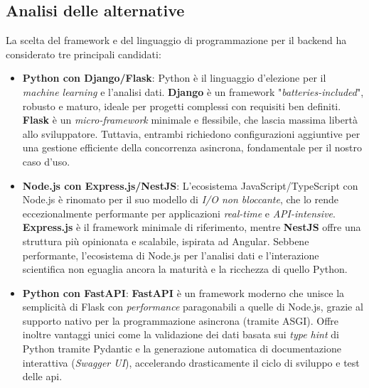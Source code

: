 \subsection{Analisi delle alternative}
La scelta del \gls{framework} e del linguaggio di programmazione per il \gls{backend} ha considerato tre principali candidati:

\begin{itemize}
    \item \textbf{Python con Django/Flask}: Python è il linguaggio d'elezione per il \textit{machine learning} e l'analisi dati. \textbf{Django} è un \gls{framework} "\textit{batteries-included}", robusto e maturo, ideale per progetti complessi con requisiti ben definiti. \textbf{Flask} è un \textit{micro-framework} minimale e flessibile, che lascia massima libertà allo sviluppatore. Tuttavia, entrambi richiedono configurazioni aggiuntive per una gestione efficiente della concorrenza asincrona, fondamentale per il nostro caso d'uso.
    
    \item \textbf{Node.js con Express.js/NestJS}: L'ecosistema JavaScript/TypeScript con Node.js è rinomato per il suo modello di \textit{I/O non bloccante}, che lo rende eccezionalmente performante per applicazioni \textit{real-time} e \textit{API-intensive}. \textbf{Express.js} è il \gls{framework} minimale di riferimento, mentre \textbf{NestJS} offre una struttura più opinionata e scalabile, ispirata ad Angular. Sebbene performante, l'ecosistema di Node.js per l'analisi dati e l'interazione scientifica non eguaglia ancora la maturità e la ricchezza di quello Python.
    
    \item \textbf{Python con FastAPI}: \textbf{FastAPI} è un \gls{framework} moderno che unisce la semplicità di Flask con \textit{performance} paragonabili a quelle di Node.js, grazie al supporto nativo per la programmazione asincrona (tramite ASGI). Offre inoltre vantaggi unici come la validazione dei dati basata sui \textit{type hint} di Python tramite Pydantic e la generazione automatica di documentazione interattiva (\textit{Swagger UI}), accelerando drasticamente il ciclo di sviluppo e test delle \gls{api}.
\end{itemize}

